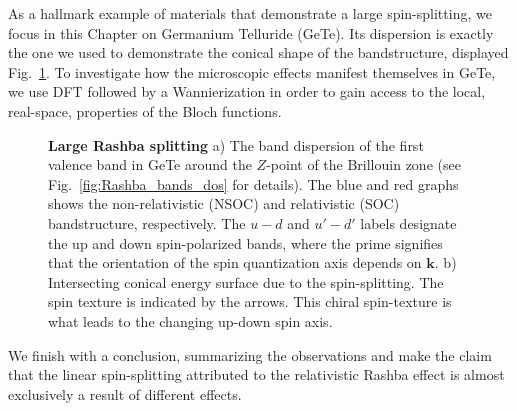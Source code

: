 As a hallmark example of materials that demonstrate a large spin-splitting, we focus in this Chapter on Germanium Telluride (GeTe).
Its dispersion is exactly the one we used to demonstrate the conical shape of the bandstructure, displayed Fig.~\ref{fig:Rashba_intro_dispersion}.
To investigate how the microscopic effects manifest themselves in GeTe, we use DFT followed by a Wannierization in order to gain access to the local, real-space, properties of the Bloch functions.
\begin{figure}[h]
	\begin{subfigure}[b]{0.49\textwidth}
	\caption{}
	\end{subfigure}
	\begin{subfigure}[b]{0.49\textwidth}
	\caption{}
	\end{subfigure}
	\caption{\label{fig:Rashba_intro_dispersion}
		{\bf Large Rashba splitting} a) The band dispersion of the first valence band in GeTe around the $Z$-point of the Brillouin zone (see Fig.~\ref{fig:Rashba_bands_dos} for details). The blue and red graphs shows the non-relativistic (NSOC) and relativistic (SOC) bandstructure, respectively. The $u-d$ and $u'-d'$ labels designate the up and down spin-polarized bands, where the prime signifies that the orientation of the spin quantization axis depends on $\bm{k}$. b) Intersecting conical energy surface due to the spin-splitting. The spin texture is indicated by the arrows. This chiral spin-texture is what leads to the changing up-down spin axis.}
\end{figure}

We finish with a conclusion, summarizing the observations and make the claim that the linear spin-splitting attributed to the relativistic Rashba effect is almost exclusively a result of different effects. 

